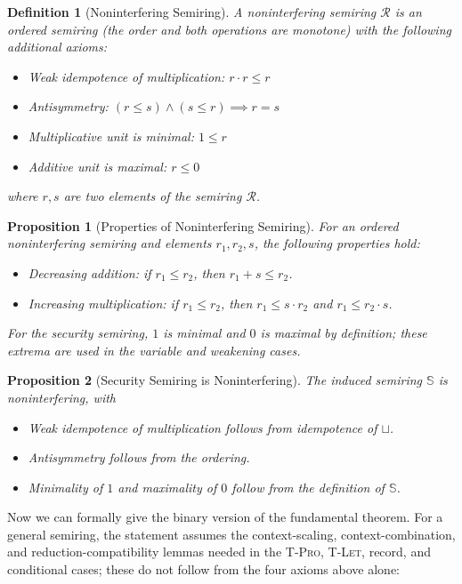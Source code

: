 \documentclass[conference]{IEEEtran}
\newcommand\secure{\mathbb{S}}
\newtheorem{definition}{Definition}
\newtheorem{proposition}{Proposition}
\begin{document}
\begin{definition}[Noninterfering Semiring]
    A noninterfering semiring $\mathcal R$ is an ordered semiring (the order and both operations are monotone) with the following additional axioms:
    \begin{itemize}
        \item Weak idempotence of multiplication: $r\cdot r\le r$
        \item Antisymmetry: $(r\le s)\wedge(s\le r)\implies r=s$
        \item Multiplicative unit is minimal: $1\le r$
        \item Additive unit is maximal: $r\le 0$
    \end{itemize}
    where $r,s$ are two elements of the semiring $\mathcal R$.
\end{definition}

\begin{proposition}[Properties of Noninterfering Semiring]
    For an ordered noninterfering semiring and elements $r_1,r_2,s$, the following properties hold:
    \begin{itemize}
        \item Decreasing addition: if $r_1\le r_2$, then $r_1+s\le r_2$.
        \item Increasing multiplication: if $r_1\le r_2$, then $r_1\le s\cdot r_2$ and $r_1\le r_2\cdot s$.
    \end{itemize}
    For the security semiring, $1$ is minimal and $0$ is maximal by definition; these extrema are used in the variable and weakening cases.
\end{proposition}

\begin{proposition}[Security Semiring is Noninterfering]
    The induced semiring $\secure$ is noninterfering, with
    \begin{itemize}
        \item Weak idempotence of multiplication follows from idempotence of $\sqcup$.
        \item Antisymmetry follows from the ordering.
        \item Minimality of $1$ and maximality of $0$ follow from the definition of $\secure$.
    \end{itemize}
\end{proposition}

Now we can formally give the binary version of the fundamental theorem. For a general semiring, the statement assumes the context-scaling, context-combination, and reduction-compatibility lemmas needed in the \textsc{T-Pro}, \textsc{T-Let}, record, and conditional cases; these do not follow from the four axioms above alone:
\end{document}
